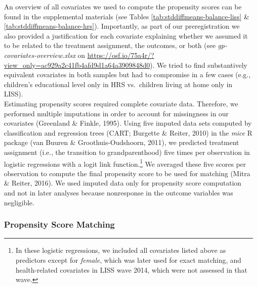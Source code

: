\documentclass[
  english,
  man, noextraspace,floatsintext]{apa7}
\begin{document}
An overview of all covariates we used to compute the propensity scores can be found in the supplemental materials (see Tables \ref{tab:stddiffmeans-balance-liss} \& \ref{tab:stddiffmeans-balance-hrs}). Importantly, as part of our preregistration we also provided a justification for each covariate explaining whether we assumed it to be related to the treatment assignment, the outcomes, or both (see \emph{gp-covariates-overview.xlsx} on \url{https://osf.io/75a4r/?view_only=ac929a2c41fb4afd9d1a64a3909848d0}). We tried to find substantively equivalent covariates in both samples but had to compromise in a few cases (e.g., children's educational level only in HRS vs.~children living at home only in LISS).\\
Estimating propensity scores required complete covariate data. Therefore, we performed multiple imputations in order to account for missingness in our covariates (Greenland \& Finkle, 1995). Using five imputed data sets computed by classification and regression trees (CART; Burgette \& Reiter, 2010) in the \emph{mice} R package (van Buuren \& Groothuis-Oudshoorn, 2011), we predicted treatment assignment (i.e., the transition to grandparenthood) five times per observation in logistic regressions with a logit link function.\footnote{In these logistic regressions, we included all covariates listed above as predictors except for \emph{female}, which was later used for exact matching, and health-related covariates in LISS wave 2014, which were not assessed in that wave.} We averaged these five scores per observation to compute the final propensity score to be used for matching (Mitra \& Reiter, 2016). We used imputed data only for propensity score computation and not in later analyses because nonresponse in the outcome variables was negligible.

\hypertarget{propensity-score-matching}{%
\subsubsection{Propensity Score Matching}\label{propensity-score-matching}}
\end{document}
